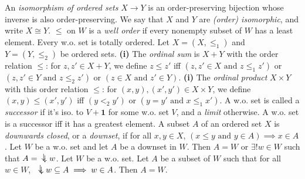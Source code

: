  An \textit{isomorphism of ordered sets} $X \to Y$ is an order-preserving bijection whose inverse is also order-preserving. We say that $X$ and $Y$ are \textit{(order) isomorphic}, and write $X \cong Y$.
 $\leq$ on $W$ is a \textit{well order} if every nonempty subset of $W$ has a least element.
 Every w.o. set is totally ordered.
 Let $X = (X, \leq_1)$ and $Y = (Y, \leq_2)$ be ordered sets. \textbf{(i)} The \textit{ordinal sum} is $X + Y$ with the order relation $\leq$: for $z, z' \in X + Y$, we define $z \leq z'$ iff $(z, z' \in X \text{ and } z \leq_1 z')$ or $(z, z' \in Y \text{ and } z \leq_2 z')$ or $(z \in X \text{ and } z' \in Y)$. \textbf{(i)} The \textit{ordinal product} $X \times Y$ with this order relation $\leq$: for $(x, y), (x', y') \in X \times Y$, we define $(x, y) \leq (x', y')$ iff $(y <_2 y')$ or $(y = y' \text{ and } x \leq_1 x')$.
 A w.o. set is called a \textit{successor} if it's iso. to $V + \mathbf{1}$ for some w.o. set $V$, and a \textit{limit} otherwise.
 A w.o. set is a successor iff it has a greatest element.
 A subset $A$ of an ordered set $X$ is \textit{downwards closed}, or a \textit{downset}, if for all $x, y \in X$, $(x \leq y \text{ and } y \in A) \implies x \in A$.
 Let $W$ be a w.o. set and let $A$ be a downset in $W$. Then $A = W$ or $\exists! w \in W$ such that $A = \ddownarrow w$.
 Let $W$ be a w.o. set. Let $A$ be a subset of $W$ such that for all $w \in W$, $\ddownarrow w \subseteq A \implies w \in A$. Then $A = W$.
